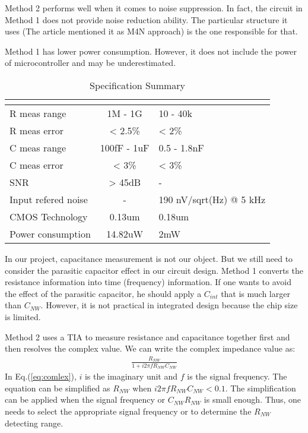 Method 2 performs well when it comes to noise suppression.
In fact, the circuit in Method 1 does not provide noise reduction ability.
The particular structure it uses (The article \cite{Juv1} mentioned it as M4N approach) is the one responsible for that.

Method 1 has lower power consumption. However, it does not include the power of microcontroller and may be underestimated.

\begin{table}[!htb]
    {\fontfamily{}\fontsize{10}{14}\selectfont
    \centering
    \begin{tabular}{l|cp{4cm}}
        & \cite{Juv2} & \cite{Jlockin}\\
        \hline
        R meas range & 1M - 1G & 10 - 40k\\
        \hline
        R meas error & < 2.5\% & < 2\%\\
        \hline
        C meas range & 100fF - 1uF & 0.5 - 1.8nF\\
        \hline
        C meas error & < 3\% & < 3\%\\
        \hline
        SNR & > 45dB & - \\
        \hline
        Input refered noise & - & 190 nV/sqrt(Hz) @ 5 kHz \\
        \hline
        CMOS Technology & 0.13um & 0.18um\\
        \hline
        Power consumption & 14.82uW & 2mW\\
    \end{tabular}
    \caption{Specification Summary}
    \label{tb:LVtable}
    }
\end{table}

In our project, capacitance measurement is not our object.
But we still need to consider the parasitic capacitor effect in our circuit design.
Method 1 converts the resistance information into time (frequency) information.
If one wants to avoid the effect of the parasitic capacitor, he should apply a $C_{int}$ that is much larger than $C_{NW}$.
However, it is not practical in integrated design because the chip size is limited.

Method 2 uses a TIA to measure resistance and capacitance together first and then resolves the complex value.
We can write the complex impedance value as:
\begin{align}
      \frac{R_{NW}}{1 + i2\pi f R_{NW} C_{NW}} \label{eq:comlex}
\end{align}
In Eq.(\ref{eq:comlex}), $i$ is the imaginary unit and $f$ is the signal frequency.
The equation can be simplified as $R_{NW}$ when $i2\pi f R_{NW} C_{NW} < 0.1$.
The simplification can be applied when the signal frequency or $C_{NW} R_{NW}$ is small enough.
Thus, one needs to select the appropriate signal frequency or to determine the $R_{NW}$ detecting range.

